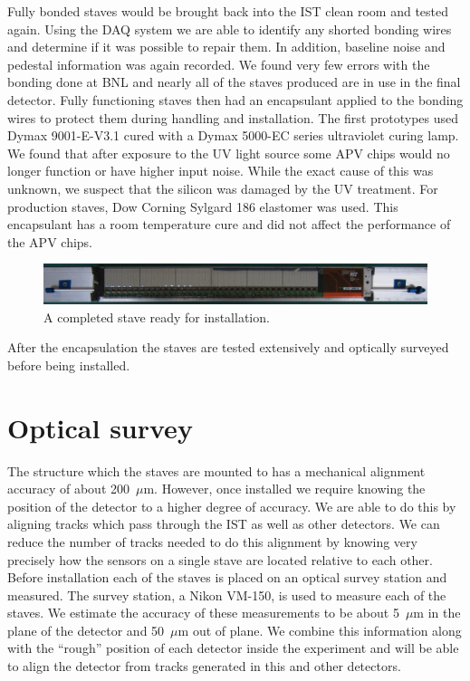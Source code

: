 \documentclass[preprint,12pt]{elsarticle}
\begin{document}
Fully bonded staves would be brought back into the IST clean room and tested
again. Using the DAQ system we are able to identify any shorted bonding wires
and determine if it was possible to repair them. In addition, baseline noise
and pedestal information was again recorded. We found very few errors with the
bonding done at BNL and nearly all of the staves produced are in use in the
final detector. Fully functioning staves then had an encapsulant applied to the
bonding wires to protect them during handling and installation. The first
prototypes used Dymax 9001-E-V3.1 cured with a Dymax 5000-EC series ultraviolet
curing lamp. We found that after exposure to the UV light source some APV chips
would no longer function or have higher input noise. While the exact cause of
this was unknown, we suspect that the silicon was damaged by the UV treatment.
For production staves, Dow Corning Sylgard 186 elastomer was used. This
encapsulant has a room temperature cure and did not affect the performance of
the APV chips.

\begin{figure}
\begin{center}
\includegraphics[width=6.5in, keepaspectratio=true, angle=0]{graphics/full_stave.jpg}
\caption{A completed stave ready for installation.
\label{fig:full_stave}}
\end{center}
\end{figure}

After the encapsulation the staves are tested extensively and optically surveyed
before being installed.

\section{Optical survey}
The structure which the staves are mounted to has a mechanical alignment
accuracy of about 200~$\mu$m. However, once installed we require knowing the
position of the detector to a higher degree of accuracy. We are able to do this
by aligning tracks which pass through the IST as well as other detectors. We
can reduce the number of tracks needed to do this alignment by knowing very
precisely how the sensors on a single stave are located relative to each other.
Before installation each of the staves is placed on an optical survey station
and measured. The survey station, a Nikon VM-150, is used to measure each of
the staves. We estimate the accuracy of these measurements to be about 5~$\mu$m in
the plane of the detector and 50~$\mu$m out of plane. We combine this information
along with the ``rough'' position of each detector inside the experiment and will
be able to align the detector from tracks generated in this and other detectors.
\end{document}
